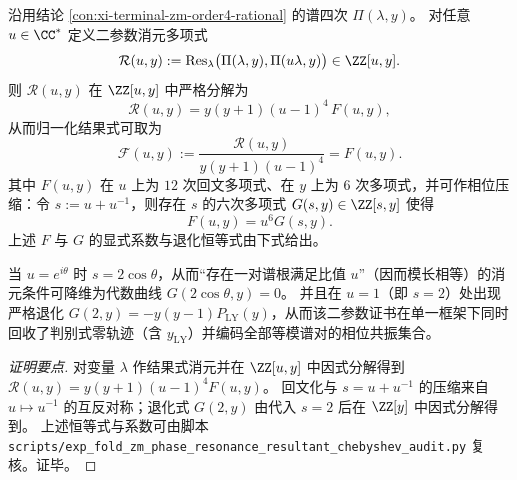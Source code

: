 \begin{conclusion}\label{con:xi-terminal-zm-phase-resonance-resultant-chebyshev}
沿用结论 \ref{con:xi-terminal-zm-order4-rational} 的谱四次 \(\Pi(\lambda,y)\)。
对任意 \(u\in\CC^{\ast}\) 定义二参数消元多项式
\[
\mathcal{R}(u,y):=\operatorname{Res}_{\lambda}\bigl(\Pi(\lambda,y),\Pi(u\lambda,y)\bigr)\in\ZZ[u,y].
\]
则 \(\mathcal{R}(u,y)\) 在 \(\ZZ[u,y]\) 中严格分解为
\[
\mathcal{R}(u,y)=y(y+1)(u-1)^4\,F(u,y),
\]
从而归一化结果式可取为
\[
\mathcal F(u,y):=\frac{\mathcal{R}(u,y)}{y(y+1)(u-1)^4}=F(u,y).
\]
其中 \(F(u,y)\) 在 \(u\) 上为 \(12\) 次回文多项式、在 \(y\) 上为 \(6\) 次多项式，并可作相位压缩：令 \(s:=u+u^{-1}\)，则存在 \(s\) 的六次多项式 \(G(s,y)\in\ZZ[s,y]\) 使得
\[
F(u,y)=u^6G(s,y).
\]
上述 \(F\) 与 \(G\) 的显式系数与退化恒等式由下式给出。

\par
当 \(u=e^{i\theta}\) 时 \(s=2\cos\theta\)，从而“存在一对谱根满足比值 \(u\)”（因而模长相等）的消元条件可降维为代数曲线 \(G(2\cos\theta,y)=0\)。
并且在 \(u=1\)（即 \(s=2\)）处出现严格退化 \(G(2,y)=-y(y-1)P_{\mathrm{LY}}(y)\)，从而该二参数证书在单一框架下同时回收了判别式零轨迹（含 \(y_{\mathrm{LY}}\)）并编码全部等模谱对的相位共振集合。
\end{conclusion}
\begin{proof}[证明要点]
对变量 \(\lambda\) 作结果式消元并在 \(\ZZ[u,y]\) 中因式分解得到 \(\mathcal{R}(u,y)=y(y+1)(u-1)^4F(u,y)\)。
回文化与 \(s=u+u^{-1}\) 的压缩来自 \(u\mapsto u^{-1}\) 的互反对称；退化式 \(G(2,y)\) 由代入 \(s=2\) 后在 \(\ZZ[y]\) 中因式分解得到。
上述恒等式与系数可由脚本 \texttt{scripts/exp\_fold\_zm\_phase\_resonance\_resultant\_chebyshev\_audit.py} 复核。证毕。
\end{proof}

